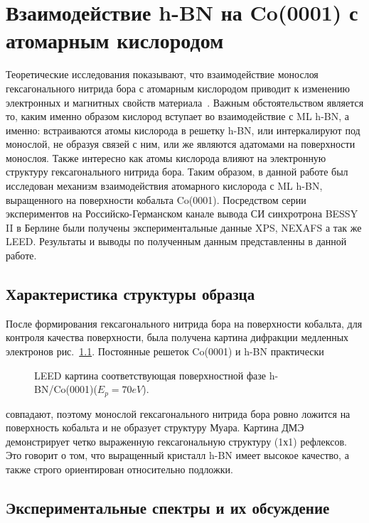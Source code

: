 \chapter{Взаимодействие h-BN на Co(0001) с атомарным кислородом} \label{chapt3}

Теоретические исследования показывают, что взаимодействие монослоя гексагонального 
нитрида бора с атомарным кислородом приводит к изменению электронных и магнитных
свойств материала~\cite{Ataca2010,Zhou2010}. Важным обстоятельством является то, каким именно образом кислород
вступает во взаимодействие с ML h-BN, а именно: встраиваются атомы кислорода в решетку 
h-BN, или интеркалируют под монослой, не образуя связей с ним, или же являются 
адатомами на поверхности монослоя. Также интересно как атомы кислорода влияют на 
электронную структуру гексагонального нитрида бора. Таким образом, в данной работе был 
исследован механизм взаимодействия атомарного кислорода с ML h-BN, выращенного на 
поверхности кобальта Co(0001). Посредством серии экспериментов на Российско-Германском
канале вывода СИ синхротрона BESSY II в Берлине были получены экспериментальные 
данные XPS, NEXAFS а так же LEED. Результаты и выводы по полученным данным 
представленны в данной работе.

\section{Характеристика структуры образца}

После формирования гексагонального нитрида бора на поверхности кобальта, для контроля
качества  поверхности, была получена картина дифракции медленных электронов
рис.~\ref{pic:LEED}. Постоянные решеток Co(0001) и h-BN практически  
\begin{figure}[!ht]
\caption{LEED картина соответствующая поверхностной фазе h-BN/Co(0001)($E_p = 70 eV$).}
\label{pic:LEED}
\end{figure}
совпадают, поэтому монослой гексагонального нитрида бора ровно ложится на поверхность
кобальта и не образует структуру Муара.
Картина ДМЭ демонстрирует четко выраженную гексагональную структуру (1х1) рефлексов.
Это говорит о том, что выращенный кристалл h-BN имеет высокое качество, а также строго 
ориентирован относительно подложки.

\section{Экспериментальные спектры и их обсуждение}

